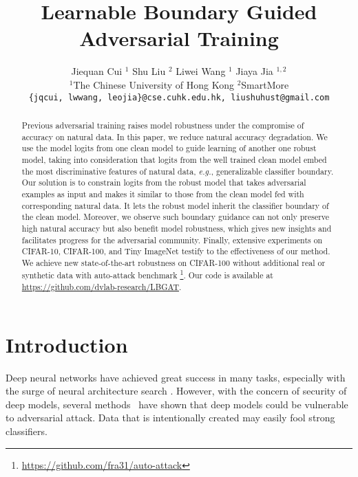 \documentclass[10pt,twocolumn,letterpaper]{article}
\begin{document}
\title{Learnable Boundary Guided Adversarial Training}

\author{
	Jiequan Cui $^{1}$ \quad 
	Shu Liu $^{2}$ \quad
	Liwei Wang $^{1}$ \quad
	Jiaya Jia $^{1,2}$ \\
	$^{1}$The Chinese University of Hong Kong \hspace{1cm} $^{2}$SmartMore \hspace{1cm} 
	\vspace{.7em}\\
	{\tt\small \{jqcui, lwwang, leojia\}@cse.cuhk.edu.hk, liushuhust@gmail.com}
}

\maketitle
\ificcvfinal\thispagestyle{empty}\fi

\begin{abstract}
   Previous adversarial training raises model robustness under the compromise of accuracy on natural data. In this paper, we reduce natural accuracy degradation. We use the model logits from one clean model to guide learning of another one robust model, taking into consideration that logits from the well trained clean model embed the most discriminative features of natural data, {\it e.g.}, generalizable classifier boundary. Our solution is to constrain logits from the robust model that takes adversarial examples as input and makes it similar to those from the clean model fed with corresponding natural data. It lets the robust model inherit the classifier boundary of the clean model. Moreover, we observe such boundary guidance can not only preserve high natural accuracy but also benefit model robustness, which gives new insights and facilitates progress for the adversarial community. Finally, extensive experiments on CIFAR-10, CIFAR-100, and Tiny ImageNet testify to the effectiveness of our method. We achieve new state-of-the-art robustness on CIFAR-100 without additional real or synthetic data with auto-attack benchmark \footnote{\url{https://github.com/fra31/auto-attack}}. Our code is available at \url{https://github.com/dvlab-research/LBGAT}.
\end{abstract}

\section{Introduction}
Deep neural networks have achieved great success in many tasks, especially with the surge of neural architecture search \cite{DBLP:conf/cvpr/ZophVSL18, DBLP:conf/iclr/LiuSY19, DBLP:conf/cvpr/TanCPVSHL19, DBLP:conf/iccv/CuiCLLSJ19, DBLP:conf/iclr/CaiGWZH20}. However, with the concern of security of deep models, several methods~\cite{DBLP:conf/cvpr/DongLPS0HL18,Xie_2019_CVPR,DBLP:journals/corr/SzegedyZSBEGF13,Shi_2019_CVPR,DBLP:conf/iclr/TramerKPGBM18,DBLP:conf/aaai/ZhengC019,DBLP:conf/iclr/TramerKPGBM18,DBLP:conf/cvpr/HeZRS16,DBLP:conf/cvpr/HuangLMW17,DBLP:journals/corr/SimonyanZ14a} have shown that deep models could be vulnerable to adversarial attack. Data that is intentionally created may easily fool strong classifiers. 
\end{document}
